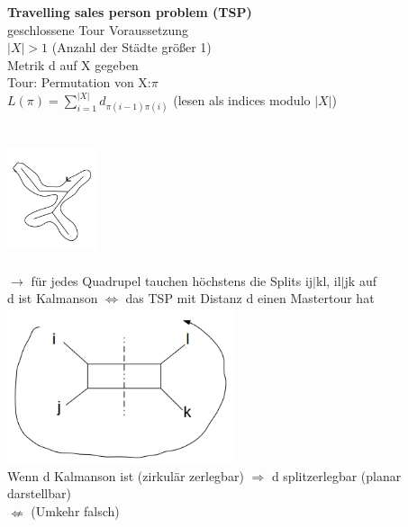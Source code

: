 \textbf{Travelling sales person problem (TSP)}\\
geschlossene Tour Voraussetzung\\
$|X|>1$ (Anzahl der Städte größer 1)\\
Metrik d auf X gegeben\\
Tour: Permutation von X:$\pi$\\
$L(\pi)=\displaystyle\sum_{i=1}^{|X|}d_{\pi(i-1)\pi(i)}$ (lesen als indices modulo $|X|$)
\\\\
\\
\includegraphics[width=0.2\textwidth]{lectures/161216/pix/6.jpg}\\

\\
$\rightarrow$ für jedes Quadrupel tauchen höchstens die Splits ij$|$kl, il$|$jk auf\\
d ist Kalmanson $\Leftrightarrow$ das TSP mit Distanz d einen Mastertour hat\\
\includegraphics[width=0.5\textwidth]{lectures/161216/pix/7.jpg}\\
Wenn d Kalmanson ist (zirkulär zerlegbar) $\Rightarrow$ d splitzerlegbar (planar darstellbar)\\
$\nLeftarrow$ (Umkehr falsch)\\

